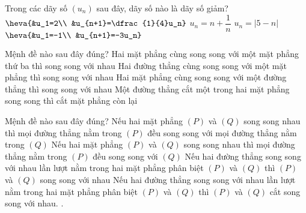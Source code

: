 \begin{ex}%
	Trong các dãy số $\left(u_n\right)$ sau đây, dãy số nào là dãy số giảm?
	\choice
	{$\heva{&u_1=2\\ &u_{n+1}=\dfrac{1}{4}u_n}$}
	{$u_n=n+\dfrac{1}{n}$}
	{$u_n=|5-n|$}
	{$\heva{&u_1=-1\\ &u_{n+1}=-3u_n}$}
\end{ex}

\begin{ex}%
	Mệnh đề nào sau đây đúng?
	\choice
	{ Hai mặt phẳng cùng song song với một mặt phẳng thứ ba thì song song với nhau}
	{Hai đường thẳng cùng song song với một mặt phẳng thì song song với nhau}
	{Hai mặt phẳng cùng song song với một đường thẳng thì song song với nhau}
	{\True Một đường thẳng cắt một trong hai mặt phẳng song song thì cắt mặt phẳng còn lại}
\end{ex}

\begin{ex}%
	Mệnh đề nào sau đây đúng?
	\choice 
	{ Nếu hai mặt phẳng $(P)$ và $(Q)$ song song nhau thì mọi đường thẳng nằm trong $(P)$ đều song song với mọi đường thẳng nằm trong $(Q)$} 
	{\True Nếu hai mặt phẳng $(P)$ và $(Q)$ song song nhau thì mọi đường thẳng nằm trong $(P)$ đều song song với $(Q)$} 
	{ Nếu hai đường thẳng song song với nhau lần lượt nằm trong hai mặt phẳng phân biệt $(P)$ và $(Q)$ thì $(P)$ và $(Q)$ song song với nhau} 
	{ Nếu hai đường thẳng song song với nhau lần lượt nằm trong hai mặt phẳng phân biệt $(P)$ và $(Q)$ thì $(P)$ và $(Q)$ cắt song song với nhau.}
	.		 
\end{ex} 

